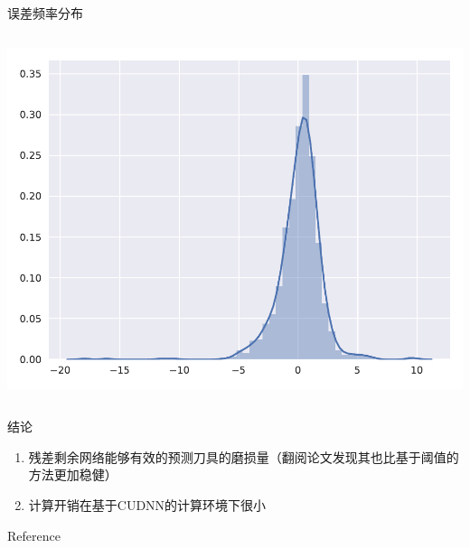 \documentclass[12pt,aspectratio=169]{beamer}
\begin{document}
\begin{frame}{误差频率分布}
\begin{columns}
			\begin{column}{0.33\textwidth}
				\includegraphics[width=\columnwidth]{picture/z_hist}
			\end{column}
			
		\end{columns}
	\end{frame}
	
	\begin{frame}{结论}
		\begin{enumerate}
			\item 残差剩余网络能够有效的预测刀具的磨损量（翻阅论文发现其也比基于阈值的方法更加稳健）
			\item 计算开销在基于CUDNN的计算环境下很小
		\end{enumerate}
		
		
	\end{frame}
	
	\begin{frame}{Reference}
		\scriptsize
		
		
	\end{frame}
\end{document}
